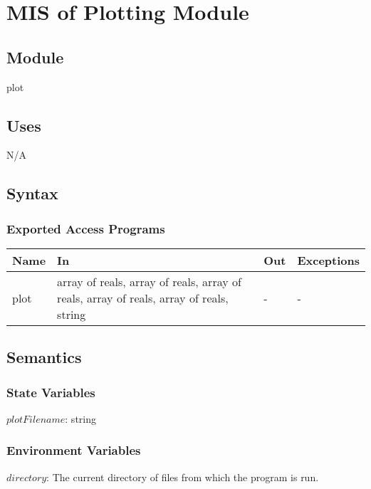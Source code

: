 \documentclass[12pt]{article}
\begin{document}
\section{MIS of Plotting Module} \label{Plot}

\subsection{Module}

plot

\subsection{Uses}

N/A

\subsection{Syntax}

\subsubsection{Exported Access Programs}

\begin{center}
\begin{tabular}{p{2cm} p{8cm} p{2cm} p{2cm}}
\hline
\textbf{Name} & \textbf{In} & \textbf{Out} & \textbf{Exceptions} \\
\hline
plot & array of reals, array of reals, array of reals, array of reals, array of reals, string & - & - \\
\hline
\end{tabular}
\end{center}

\subsection{Semantics}

\subsubsection{State Variables}

$plotFilename$: string

\subsubsection{Environment Variables}

$directory$: The current directory of files from which the program is run.
\end{document}
